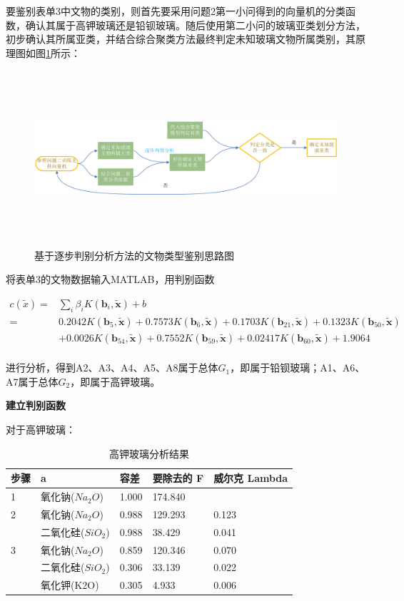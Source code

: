 \documentclass{my_paper}
\begin{document}
要鉴别表单3中文物的类别，则首先要采用问题2第一小问得到的向量机的分类函数，确认其属于高钾玻璃还是铅钡玻璃。随后使用第二小问的玻璃亚类划分方法，初步确认其所属亚类，并结合综合聚类方法最终判定未知玻璃文物所属类别，其原理图如图\ref{未知判别思路图}所示：
\begin{figure}[H]
    \centering
    \includegraphics[height=6.5cm,width=1.1\textwidth]{对未知玻璃分类思路图.jpg}
    \caption{基于逐步判别分析方法的文物类型鉴别思路图}
    \label{未知判别思路图}
\end{figure}

将表单3的文物数据输入MATLAB，用判别函数

$$\begin{aligned}
c(\tilde{x})=& \sum_{i} \beta_{i} K\left(\boldsymbol{b}_{i}, \tilde{\boldsymbol{x}}\right)+b \\
=& 0.2042 K\left(\boldsymbol{b}_{5}, \tilde{\boldsymbol{x}}\right)+0.7573 K\left(\boldsymbol{b}_{6}, \tilde{\boldsymbol{x}}\right)+0.1703 K\left(\boldsymbol{b}_{21}, \tilde{\boldsymbol{x}}\right)+0.1323 K\left(\boldsymbol{b}_{50}, \tilde{\boldsymbol{x}}\right) \\
&+0.0026 K\left(\boldsymbol{b}_{54}, \tilde{\boldsymbol{x}}\right)+0.7552 K\left(\boldsymbol{b}_{59}, \tilde{\boldsymbol{x}}\right)+0.02417 K\left(\boldsymbol{b}_{60}, \tilde{\boldsymbol{x}}\right)+1.9064
\end{aligned}$$ \\
进行分析，得到A2、A3、A4、A5、A8属于总体$G_1$，即属于铅钡玻璃；A1、A6、A7属于总体$G_2$，即属于高钾玻璃。

\textbf{建立判别函数}

对于高钾玻璃：

\begin{table}[H]
    \centering
    \caption{高钾玻璃分析结果}
    \begin{tabular}{lllll}
    \hline 
        步骤 & a & 容差 & 要除去的 F & 威尔克 Lambda \\ \hline
        1 & 氧化钠($Na_2O$) & 1.000 & 174.840 & ~ \\ 
        2 & 氧化钠($Na_2O$) & 0.988 & 129.293 & 0.123 \\ 
        ~ & 二氧化硅($SiO_2$) & 0.988 & 38.429 & 0.041 \\ 
        3 & 氧化钠($Na_2O$) & 0.859 & 120.346 & 0.070 \\ 
        ~ & 二氧化硅($SiO_2$) & 0.306 & 33.139 & 0.022 \\ 
        ~ & 氧化钾(K2O) & 0.305 & 4.933 & 0.006 \\ \hline
    \end{tabular}
\end{table}
\end{document}
